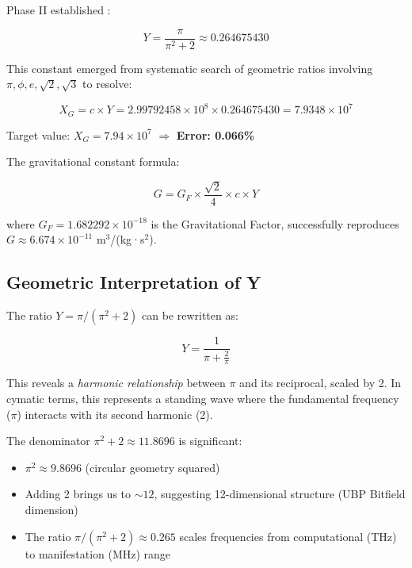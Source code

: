 \documentclass[11pt,a4paper]{article}
\begin{document}
Phase II established \cite{phase_ii_report}:

\begin{equation}
Y = \frac{\pi}{\pi^2 + 2} \approx 0.264675430
\end{equation}

This constant emerged from systematic search of geometric ratios involving $\pi, \phi, e, \sqrt{2}, \sqrt{3}$ to resolve:

\begin{equation}
X_G = c \times Y = 2.99792458 \times 10^8 \times 0.264675430 = 7.9348 \times 10^7
\end{equation}

Target value: $X_G = 7.94 \times 10^7$ $\Rightarrow$ \textbf{Error: 0.066\%}

The gravitational constant formula:

\begin{equation}
G = G_F \times \frac{\sqrt{2}}{4} \times c \times Y
\label{eq:gravitational_constant}
\end{equation}

where $G_F = 1.682292 \times 10^{-18}$ is the Gravitational Factor, successfully reproduces $G \approx 6.674 \times 10^{-11}$ m$^3$/(kg·s$^2$).

\subsection{Geometric Interpretation of Y}

The ratio $Y = \pi/(\pi^2 + 2)$ can be rewritten as:

\begin{equation}
Y = \frac{1}{\pi + \frac{2}{\pi}}
\label{eq:Y_harmonic}
\end{equation}

This reveals a \emph{harmonic relationship} between $\pi$ and its reciprocal, scaled by 2. In cymatic terms, this represents a standing wave where the fundamental frequency ($\pi$) interacts with its second harmonic (2).

The denominator $\pi^2 + 2 \approx 11.8696$ is significant:
\begin{itemize}
    \item $\pi^2 \approx 9.8696$ (circular geometry squared)
    \item Adding 2 brings us to $\sim 12$, suggesting 12-dimensional structure (UBP Bitfield dimension)
    \item The ratio $\pi/(\pi^2 + 2) \approx 0.265$ scales frequencies from computational (THz) to manifestation (MHz) range
\end{itemize}
\end{document}
